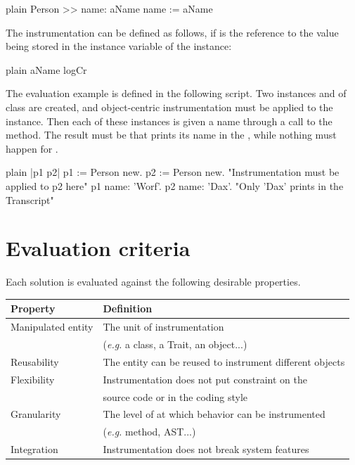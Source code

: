\documentclass[10pt,twoside,english]{_support/latex/sbabook/sbabook}
\begin{document}
\begin{displaycode}{plain}
Person >> name: aName
    name := aName
\end{displaycode}

The instrumentation can be defined as follows, if  is the reference to the value being stored in the  instance variable of the  instance:

\begin{displaycode}{plain}
aName logCr
\end{displaycode}

The evaluation example is defined in the following script. Two instances  and  of class  are created, and object-centric instrumentation must be applied to the  instance. Then each of these instances is given a name through a call to the  method. The result must be that  prints its name in the , while nothing must happen for .

\begin{displaycode}{plain}
  |p1 p2|
  p1 := Person new.
  p2 := Person new.
  "Instrumentation must be applied to p2 here"
  p1 name: 'Worf'.
  p2 name: 'Dax'.
  "Only 'Dax' prints in the Transcript"
\end{displaycode}
\section{Evaluation criteria}
Each solution is evaluated against the following desirable properties.

\begin{tabular}{ll}
\toprule
\textbf{Property} & \textbf{Definition} \\
\midrule
Manipulated entity & The unit of instrumentation \\
 & (\textit{e.g.} a class, a Trait, an object...) \\
Reusability & The entity can be reused to instrument different objects \\
Flexibility & Instrumentation does not put constraint on the \\
 & source code or in the coding style \\
Granularity & The level of at which behavior can be instrumented \\
 & (\textit{e.g.} method, AST...) \\
Integration & Instrumentation does not break system features \\
\bottomrule
\end{tabular}
\end{document}
